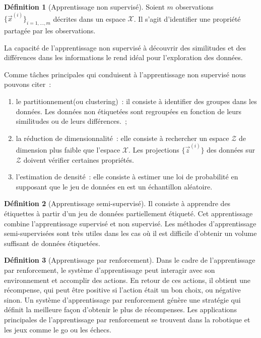\documentclass[a4paper,12pt,twoside]{report}
\theoremstyle{definition}
\newtheorem{defi}{Définition}
\theoremstyle{plain}
\theoremstyle{remark}
\begin{document}
\begin{defi}[Apprentissage non supervisé]
	Soient $m$ observations $\{\vec{x}^{(i)}\}_{i=1,\ldots,m}$ décrites dans un espace $\mathcal{X}$. Il s'agit d'identifier une propriété partagée par les observations.
\end{defi}

La capacité de l'apprentissage non supervisé à découvrir des similitudes et des différences dans les informations le rend idéal pour l'exploration des données. %

Comme tâches principales qui conduisent à l'apprentissage non supervisé nous pouvons citer~:
\begin{enumerate}
	\item le partitionnement(ou clustering)~: il consiste à identifier des groupes dans les données. Les données non étiquetées sont regroupées en fonction de leurs similitudes ou de leurs différences.~;
	
	\item la réduction de dimensionnalité~: elle consiste à rechercher un espace $\mathcal{Z}$ de dimension plus faible que l'espace $\mathcal{X}$. Les projections $\{\vec{z}^{(i)}\}$ des données sur $\mathcal{Z}$ doivent vérifier certaines propriétés.
	
	\item l'estimation de densité~: elle consiste à estimer une loi de probabilité en supposant que le jeu de données en est un échantillon aléatoire.
	
\end{enumerate}

\begin{defi}[Apprentissage semi-supervisé]
	Il consiste à apprendre des étiquettes à partir d'un jeu de données partiellement étiqueté. Cet apprentissage combine l'apprentissage supervisé et non supervisé. Les méthodes d'apprentissage semi-supervisées sont très utiles dans les cas où il est difficile d'obtenir un volume suffisant de données étiquetées.
\end{defi}

\begin{defi}[Apprentissage par renforcement]
	Dans le cadre de l'apprentissage par renforcement, le système d'apprentissage peut interagir avec son environnement et accomplir des actions. En retour de ces actions, il obtient une récompense, qui peut être positive si l'action était un bon choix, ou négative sinon. Un système d'apprentissage par renforcement génère une stratégie qui définit la meilleure façon d'obtenir le plus de récompenses. Les applications principales de l'apprentissage par renforcement se trouvent dans la robotique et les jeux comme le go ou les échecs.
\end{defi}
\end{document}

